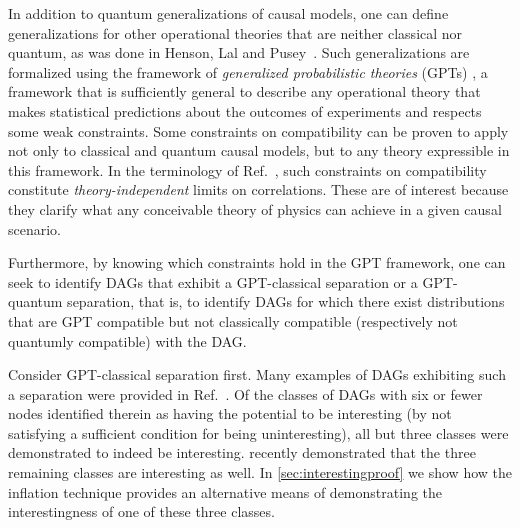 In addition to quantum generalizations of causal models, one can define generalizations for other operational theories that are neither classical nor quantum, as was done in Henson, Lal and Pusey~\cite{pusey2014gdag}. 
Such generalizations are formalized using the framework of {\em generalized probabilistic theories} (GPTs) \cite{Barnum2012GPT,Janotta2014GPT}, a framework that is sufficiently general to describe any operational theory that makes statistical predictions about the outcomes of experiments and respects some weak constraints.  Some constraints on compatibility can be proven to apply not only to classical and quantum causal models, but to any theory expressible in this framework.  %
In the terminology of Ref.~\cite{pusey2014gdag},  such constraints on compatibility constitute {\em theory-independent} limits on correlations.  These are of interest because they clarify what any conceivable theory of physics can achieve in a given causal scenario.  

Furthermore, by knowing which constraints hold in the GPT framework, one can seek to identify DAGs that exhibit a GPT-classical separation or a GPT-quantum separation, that is, to identify DAGs for which there exist distributions that are GPT compatible but not classically compatible (respectively not quantumly compatible) with the DAG.  
 
Consider GPT-classical separation first.  Many examples of DAGs exhibiting such a separation were provided in Ref.~\cite{pusey2014gdag}.   Of the classes of DAGs with six or fewer nodes identified therein as having the potential to be interesting (by not satisfying a sufficient condition for being uninteresting), all but three classes were demonstrated to indeed be interesting.  \citet{pianaar2016interesting} recently demonstrated that the three remaining classes are interesting as well.  In \cref{sec:interestingproof} we show how the inflation technique provides an alternative means of demonstrating the interestingness of one of these three classes. 


